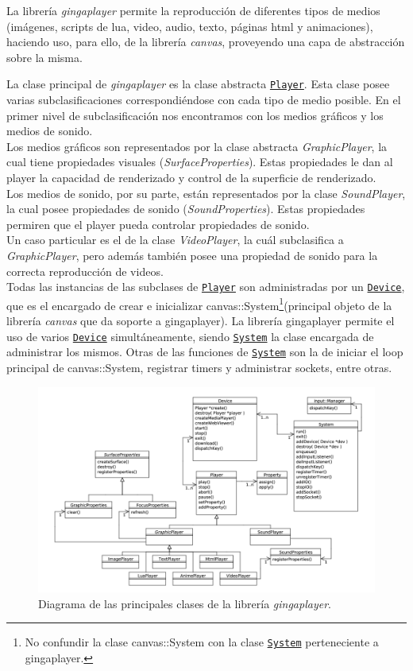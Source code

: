 La librería \emph{gingaplayer} permite la reproducción de diferentes tipos de medios (imágenes, scripts de lua, video, audio, texto, páginas html y animaciones), haciendo uso, para ello, de la librería \emph{canvas}, proveyendo una capa de abstracción sobre la misma.

La clase principal de \emph{gingaplayer} es la clase abstracta \hyperlink{classplayer_1_1Player}{\texttt{Player}}. Esta clase posee varias subclasificaciones correspondiéndose con cada tipo de medio posible.
En el primer nivel de subclasificación nos encontramos con los medios gráficos y los medios de sonido.\\
Los medios gráficos son representados por la clase abstracta \emph{GraphicPlayer}, la cual tiene propiedades visuales (\emph{SurfaceProperties}). Estas propiedades le dan al player la capacidad de renderizado y control de la superficie de renderizado.\\
Los medios de sonido, por su parte, están representados por la clase \emph{SoundPlayer}, la cual posee propiedades de sonido (\emph{SoundProperties}). Estas propiedades permiren que el player pueda controlar propiedades de sonido.\\
Un caso particular es el de la clase \emph{VideoPlayer}, la cuál subclasifica a \emph{GraphicPlayer}, pero además también posee una propiedad de sonido para la correcta reproducción de videos.\\

Todas las instancias de las subclases de \hyperlink{classplayer_1_1Player}{\texttt{Player}} son administradas por un \hyperlink{classplayer_1_1Device}{\texttt{Device}}, que es el encargado de crear e inicializar
canvas::System\footnote{No confundir la clase canvas::System con la clase \hyperlink{classplayer_1_1System}{\texttt{System}} perteneciente a gingaplayer.}(principal objeto de la librería \emph{canvas} que da soporte a gingaplayer). La librería gingaplayer permite el uso de varios \hyperlink{classplayer_1_1Device}{\texttt{Device}} simultáneamente,
siendo \hyperlink{classplayer_1_1System}{\texttt{System}} la clase encargada de administrar los mismos. Otras de las funciones de \hyperlink{classplayer_1_1System}{\texttt{System}} son la de iniciar el loop principal de canvas::System, registrar timers y administrar sockets, entre otras.

\begin{figure}[h!]
	\centering
	\includegraphics[scale=0.5]{resources/uml-dtv-gingaplayer.jpg}
	\caption{Diagrama de las principales clases de la librería \emph{gingaplayer}.}
\end{figure}

\FloatBarrier
